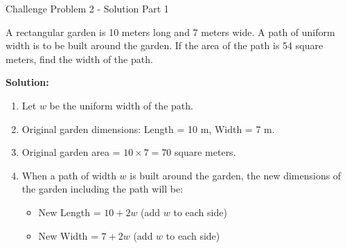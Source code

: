 \documentclass[aspectratio=169]{beamer}
\begin{document}
\begin{frame}{Challenge Problem 2 - Solution Part 1}
    \begin{tcolorbox}[colback=lightgray,colframe=accent,title=Detailed Solution (Part 1)]
        \footnotesize
        A rectangular garden is 10 meters long and 7 meters wide. A path of uniform width is to be built around the garden. If the area of the path is 54 square meters, find the width of the path.
        
        \textbf{Solution:}
        \begin{enumerate}
            \setlength{\itemsep}{0.5em}
            \item Let $w$ be the uniform width of the path.
            \item Original garden dimensions: Length = 10 m, Width = 7 m.
            \item Original garden area = $10 \times 7 = 70$ square meters.
            \item When a path of width $w$ is built around the garden, the new dimensions of the garden including the path will be:
            \begin{itemize}
                \item New Length = $10 + 2w$ (add $w$ to each side)
                \item New Width = $7 + 2w$ (add $w$ to each side)
            \end{itemize}
        \end{enumerate}
    \end{tcolorbox}
\end{frame}
\end{document}

